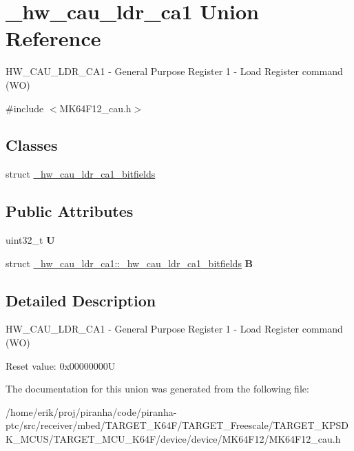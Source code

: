 \hypertarget{union__hw__cau__ldr__ca1}{}\section{\+\_\+hw\+\_\+cau\+\_\+ldr\+\_\+ca1 Union Reference}
\label{union__hw__cau__ldr__ca1}


H\+W\+\_\+\+C\+A\+U\+\_\+\+L\+D\+R\+\_\+\+C\+A1 -\/ General Purpose Register 1 -\/ Load Register command (WO)  




{\ttfamily \#include $<$M\+K64\+F12\+\_\+cau.\+h$>$}

\subsection*{Classes}
\begin{DoxyCompactItemize}
\item 
struct \hyperlink{struct__hw__cau__ldr__ca1_1_1__hw__cau__ldr__ca1__bitfields}{\+\_\+hw\+\_\+cau\+\_\+ldr\+\_\+ca1\+\_\+bitfields}
\end{DoxyCompactItemize}
\subsection*{Public Attributes}
\begin{DoxyCompactItemize}
\item 
uint32\+\_\+t {\bfseries U}\hypertarget{union__hw__cau__ldr__ca1_abdf77119a2d888fd7681dc17a67571ed}{}\label{union__hw__cau__ldr__ca1_abdf77119a2d888fd7681dc17a67571ed}

\item 
struct \hyperlink{struct__hw__cau__ldr__ca1_1_1__hw__cau__ldr__ca1__bitfields}{\+\_\+hw\+\_\+cau\+\_\+ldr\+\_\+ca1\+::\+\_\+hw\+\_\+cau\+\_\+ldr\+\_\+ca1\+\_\+bitfields} {\bfseries B}\hypertarget{union__hw__cau__ldr__ca1_a1fd8c134aab579e17362fca91cb545be}{}\label{union__hw__cau__ldr__ca1_a1fd8c134aab579e17362fca91cb545be}

\end{DoxyCompactItemize}


\subsection{Detailed Description}
H\+W\+\_\+\+C\+A\+U\+\_\+\+L\+D\+R\+\_\+\+C\+A1 -\/ General Purpose Register 1 -\/ Load Register command (WO) 

Reset value\+: 0x00000000U 

The documentation for this union was generated from the following file\+:\begin{DoxyCompactItemize}
\item 
/home/erik/proj/piranha/code/piranha-\/ptc/src/receiver/mbed/\+T\+A\+R\+G\+E\+T\+\_\+\+K64\+F/\+T\+A\+R\+G\+E\+T\+\_\+\+Freescale/\+T\+A\+R\+G\+E\+T\+\_\+\+K\+P\+S\+D\+K\+\_\+\+M\+C\+U\+S/\+T\+A\+R\+G\+E\+T\+\_\+\+M\+C\+U\+\_\+\+K64\+F/device/device/\+M\+K64\+F12/M\+K64\+F12\+\_\+cau.\+h\end{DoxyCompactItemize}
